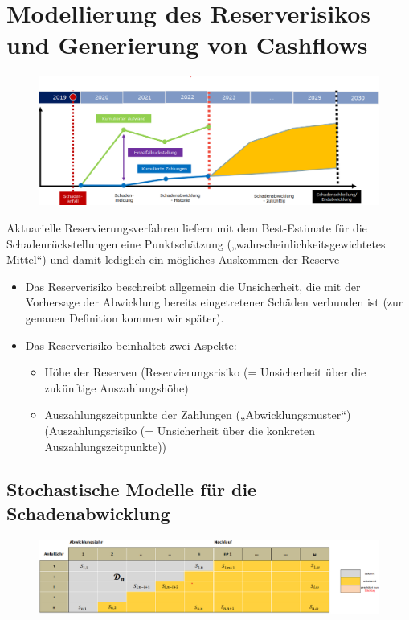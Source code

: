 \documentclass[12pt]{report}
\theoremstyle{dotless}
\theoremstyle{definition}
\begin{document}
\section{Modellierung des Reserverisikos und Generierung von Cashflows}
\begin{figure}[ht]
	\centering
	\includegraphics[width= \textwidth]{Bilder/Einzelschaden.png}
\end{figure}
Aktuarielle Reservierungsverfahren liefern mit dem Best-Estimate für die Schadenrückstellungen eine Punktschätzung („wahrscheinlichkeitsgewichtetes Mittel“) und damit lediglich ein mögliches Auskommen der Reserve

\begin{itemize}
\item Das Reserverisiko beschreibt allgemein die Unsicherheit, die mit der Vorhersage der Abwicklung bereits eingetretener Schäden verbunden ist (zur genauen Definition kommen wir später).
\item Das Reserverisiko beinhaltet zwei Aspekte:
\begin{itemize}
\item Höhe der Reserven (Reservierungsrisiko (= Unsicherheit über die zukünftige Auszahlungshöhe)
\item Auszahlungszeitpunkte der Zahlungen („Abwicklungsmuster“) (Auszahlungsrisiko (= Unsicherheit über die konkreten Auszahlungszeitpunkte))
\end{itemize}

\end{itemize}

\subsection{Stochastische Modelle für die Schadenabwicklung}

\begin{figure}[ht]
	\centering
	\includegraphics[width= \textwidth]{Bilder/Dreieck.png}
\end{figure}
\end{document}
